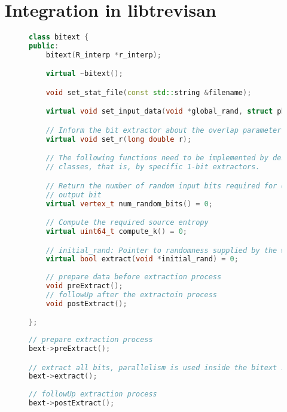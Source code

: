 \section{Integration in libtrevisan}
\label{sec:integration}

\begin{figure}
\begin{lstlisting}[language=C++,captionpos=b,backgroundcolor=\color{gray!20}, caption=\"Anderungsvorschlag f"ur die Klasste \texttt{bitext}, label=lst:codevorschlag]
class bitext {
public:
	bitext(R_interp *r_interp);

	virtual ~bitext();

	void set_stat_file(const std::string &filename);

	virtual void set_input_data(void *global_rand, struct phys_params &pp);

	// Inform the bit extractor about the overlap parameter of the weak design
	virtual void set_r(long double r);

	// The following functions need to be implemented by derived
	// classes, that is, by specific 1-bit extractors.

	// Return the number of random input bits required for one
	// output bit
	virtual vertex_t num_random_bits() = 0;

	// Compute the required source entropy
	virtual uint64_t compute_k() = 0;

	// initial_rand: Pointer to randomness supplied by the weak design
	virtual bool extract(void *initial_rand) = 0;
	
	// prepare data before extraction process 
	void preExtract();
	// followUp after the extractoin process
	void postExtract();

};
\end{lstlisting}
\end{figure}
\begin{figure}
\begin{lstlisting}[language=C++,captionpos=b,backgroundcolor=\color{gray!20}, caption=\"Anderungsvorschlag f"ur Extraktionsprozess, label=lst:codevorschlag2]
// prepare extraction process
bext->preExtract();

// extract all bits, parallelism is used inside the bitext implementation
bext->extract();
	
// followUp extraction process
bext->postExtract();
\end{lstlisting}
\end{figure}

